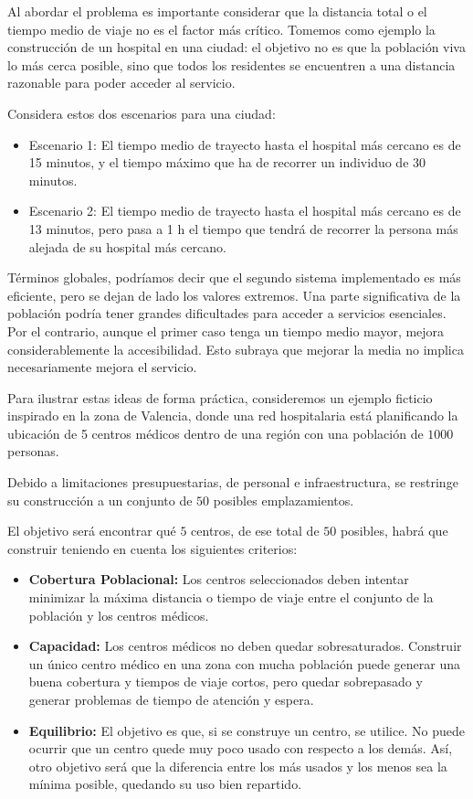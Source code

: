\documentclass[12pt,a4paper]{book}
\begin{document}
Al abordar el problema es importante considerar que la distancia total o el tiempo medio de viaje no es el factor más crítico. 
Tomemos como ejemplo la construcción de un hospital en una ciudad: el objetivo no es que la población viva lo más cerca posible, sino que todos los residentes se encuentren a una distancia razonable para poder acceder al servicio.

Considera estos dos escenarios para una ciudad:

\begin{itemize}
    \item Escenario 1: El tiempo medio de trayecto hasta el hospital más cercano es de 15 minutos, y el tiempo máximo que ha de recorrer un individuo de 30 minutos.
    \item Escenario 2: El tiempo medio de trayecto hasta el hospital más cercano es de 13 minutos, pero pasa a 1 h el tiempo que tendrá de recorrer la persona más alejada de su hospital más cercano.
\end{itemize} 

Términos globales, podríamos decir que el segundo sistema implementado es más eficiente, pero se dejan de lado los valores extremos.
Una parte significativa de la población podría tener grandes dificultades para acceder a servicios esenciales.
Por el contrario, aunque el primer caso tenga un tiempo medio mayor, mejora considerablemente la accesibilidad. Esto subraya que mejorar la media no implica necesariamente mejora el servicio.
\newpage

Para ilustrar estas ideas de forma práctica, consideremos un ejemplo ficticio inspirado en la zona de Valencia, donde una red hospitalaria está
planificando la ubicación de 5 centros médicos dentro de una región con una población de $1000$ personas. 

Debido a limitaciones presupuestarias, de personal e infraestructura, se restringe su construcción a un conjunto de $50$ posibles emplazamientos. 

El objetivo será encontrar qué $5$ centros, de ese total de $50$ posibles, habrá que construir teniendo en cuenta los siguientes criterios:

\begin{itemize}
    \item \textbf{Cobertura Poblacional:} Los centros seleccionados deben intentar minimizar la máxima distancia o tiempo de viaje entre el conjunto de la población y los centros médicos.
    \item \textbf{Capacidad:} Los centros médicos no deben quedar sobresaturados. Construir un único centro médico en una zona con mucha población puede generar una buena cobertura y tiempos de viaje cortos, pero quedar sobrepasado y generar problemas de tiempo de atención y espera.
    \item \textbf{Equilibrio:} El objetivo es que, si se construye un centro, se utilice. No puede ocurrir que un centro quede muy poco usado con respecto a los demás. Así, otro objetivo será que la diferencia entre los más usados y los menos sea la mínima posible, quedando su uso bien repartido.
\end{itemize}
\end{document}
